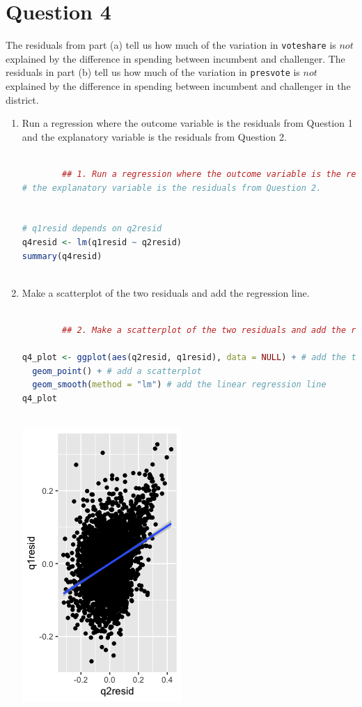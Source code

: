 \documentclass[12pt,letterpaper]{article}
\begin{document}
\newpage	
\section*{Question 4}%
\noindent The residuals from part (a) tell us how much of the variation in \texttt{voteshare} is $not$ explained by the difference in spending between incumbent and challenger. The residuals in part (b) tell us how much of the variation in \texttt{presvote} is $not$ explained by the difference in spending between incumbent and challenger in the district.
	\begin{enumerate}
		\item Run a regression where the outcome variable is the residuals from Question 1 and the explanatory variable is the residuals from Question 2.	\vspace{6cm}
		
		\begin{lstlisting}[language=R]
		
		## 1. Run a regression where the outcome variable is the residuals from Question 1 and 
# the explanatory variable is the residuals from Question 2.


# q1resid depends on q2resid
q4resid <- lm(q1resid ~ q2resid)
summary(q4resid)
		
		\end{lstlisting}
		
		\item Make a scatterplot of the two residuals and add the regression line. 	\vspace{6cm}
		
		
		\begin{lstlisting}[language=R]
		
		## 2. Make a scatterplot of the two residuals and add the regression line

q4_plot <- ggplot(aes(q2resid, q1resid), data = NULL) + # add the two residuals
  geom_point() + # add a scatterplot
  geom_smooth(method = "lm") # add the linear regression line
q4_plot
		
		\end{lstlisting}
		
		\includegraphics[scale=0.85]{plot_4.png}
		

\end{enumerate}
\end{document}
